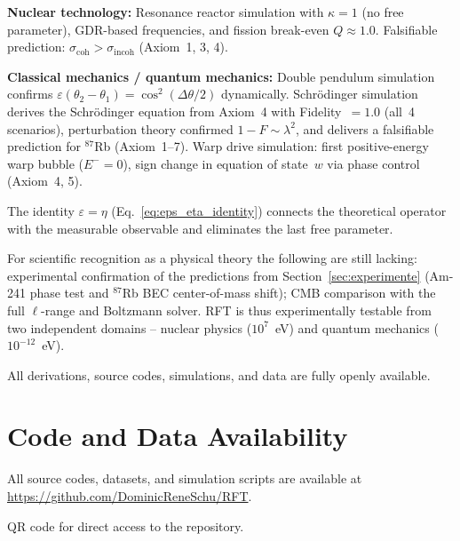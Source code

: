 \documentclass[12pt]{iopart}
\begin{document}
	\textbf{Nuclear technology:}
	Resonance reactor simulation with $\kappa = 1$ (no
	free parameter), GDR-based frequencies, and fission
	break-even $Q \approx 1.0$.
	Falsifiable prediction:
	$\sigma_{\mathrm{coh}}
	> \sigma_{\mathrm{incoh}}$ (Axiom~1, 3, 4).
	
	\textbf{Classical mechanics / quantum mechanics:}
	Double pendulum simulation confirms
	$\varepsilon(\theta_2-\theta_1) = \cos^2(\Delta\theta/2)$
	dynamically. Schrödinger simulation derives the
	Schrödinger equation from Axiom~4 with Fidelity~$= 1.0$
	(all~4 scenarios), perturbation theory confirmed
	$1-F \sim \lambda^2$, and delivers a falsifiable
	prediction for ${}^{87}$Rb (Axiom~1--7).
	Warp drive simulation: first positive-energy warp bubble
	($E^- = 0$), sign change in equation of state~$w$
	via phase control (Axiom~4, 5).
	
	The identity $\varepsilon = \eta$
	(Eq.~\ref{eq:eps_eta_identity}) connects the theoretical
	operator with the measurable observable and eliminates
	the last free parameter.
	
	For scientific recognition as a physical theory the
	following are still lacking: experimental confirmation
	of the predictions from Section~\ref{sec:experimente}
	(Am-241 phase test and ${}^{87}$Rb BEC center-of-mass
	shift); CMB comparison with the full $\ell$-range and
	Boltzmann solver.
	RFT is thus experimentally testable from two independent
	domains -- nuclear physics ($10^7$~eV) and quantum
	mechanics ($10^{-12}$~eV).
	
	All derivations, source codes, simulations, and data
	are fully openly available.
	
	
	\section*{Code and Data Availability}
	
	All source codes, datasets, and simulation scripts are
	available at
	\url{https://github.com/DominicReneSchu/RFT}.
	
	\medskip
	\noindent
	\hfill
	\begin{minipage}[b]{0.7\linewidth}
		\small QR code for direct access to the repository.
	\end{minipage}
	
\end{document}
